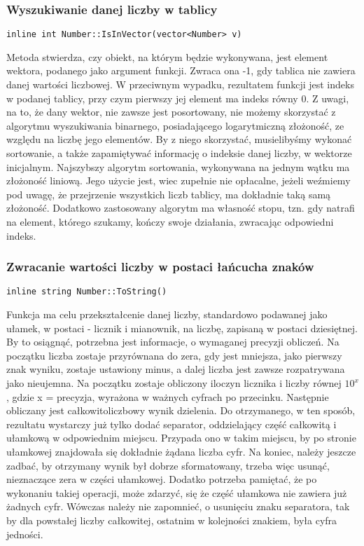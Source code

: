 \documentclass[twoside,a4paper]{book}
\begin{document}
\subsubsection{Wyszukiwanie danej liczby w tablicy}
\begin{lstlisting}
inline int Number::IsInVector(vector<Number> v)
\end{lstlisting}
Metoda stwierdza, czy obiekt, na którym będzie wykonywana, jest element wektora, podanego jako argument funkcji. Zwraca ona -1, gdy tablica nie zawiera danej wartości liczbowej. W przeciwnym wypadku, rezultatem funkcji jest indeks w podanej tablicy, przy czym pierwszy jej element ma indeks równy 0. Z uwagi, na to, że dany wektor, nie zawsze jest posortowany, nie możemy skorzystać z algorytmu wyszukiwania binarnego, posiadającego logarytmiczną złożoność, ze względu na liczbę jego elementów. By z niego skorzystać, musielibyśmy wykonać sortowanie, a także zapamiętywać informację o indeksie danej liczby, w wektorze inicjalnym. Najszybszy algorytm sortowania, wykonywana na jednym wątku ma złożoność liniową. Jego użycie jest, wiec zupełnie nie opłacalne, jeżeli weźmiemy pod uwagę, że przejrzenie wszystkich liczb tablicy, ma dokładnie taką samą złożoność. Dodatkowo zastosowany algorytm ma własność stopu, tzn. gdy natrafi na element, którego szukamy, kończy swoje działania, zwracając odpowiedni indeks.
\\

\subsubsection{Zwracanie wartości liczby w postaci łańcucha znaków}
\begin{lstlisting}
inline string Number::ToString()
\end{lstlisting}
Funkcja ma celu przekształcenie danej liczby, standardowo podawanej jako ułamek, w postaci - licznik i mianownik, na liczbę, zapisaną w postaci dziesiętnej. By to osiągnąć, potrzebna jest informacje, o wymaganej precyzji obliczeń. Na początku liczba zostaje przyrównana do zera, gdy jest mniejsza, jako pierwszy znak wyniku, zostaje ustawiony minus, a dalej liczba jest zawsze rozpatrywana jako nieujemna. Na początku zostaje obliczony iloczyn licznika i liczby równej $10^x$, gdzie x = precyzja, wyrażona w ważnych cyfrach po przecinku. Następnie obliczany jest całkowitoliczbowy wynik dzielenia. Do otrzymanego, w ten sposób, rezultatu wystarczy już tylko dodać separator, oddzielający część całkowitą i ułamkową w odpowiednim miejscu. Przypada ono w takim miejscu, by po stronie ułamkowej znajdowała się dokładnie żądana liczba cyfr. Na koniec, należy jeszcze zadbać, by otrzymany wynik był dobrze sformatowany, trzeba więc usunąć, nieznaczące zera w części ułamkowej. Dodatko potrzeba pamiętać, że po wykonaniu takiej operacji, może zdarzyć, się że część ułamkowa nie zawiera już żadnych cyfr. Wówczas należy nie zapomnieć, o usunięciu znaku separatora, tak by dla powstałej liczby całkowitej, ostatnim w kolejności znakiem, była cyfra jedności.
\\
\end{document}
